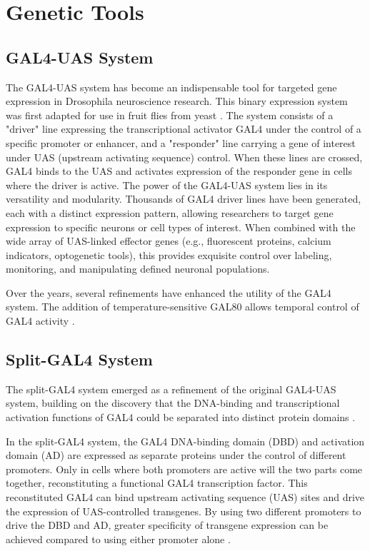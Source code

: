 \documentclass[../main/thesis_msc.tex]{subfiles}
\begin{document}
	\section{Genetic Tools}
	\subsection{GAL4-UAS System}

	The GAL4-UAS system has become an indispensable tool for targeted gene expression in Drosophila neuroscience research. This binary expression system was first adapted for use in fruit flies from yeast \autocite{brand_targeted_1993}. The system consists of a "driver" line expressing the transcriptional activator GAL4 under the control of a specific promoter or enhancer, and a "responder" line carrying a gene of interest under UAS (upstream activating sequence) control. When these lines are crossed, GAL4 binds to the UAS and activates expression of the responder gene in cells where the driver is active. The power of the GAL4-UAS system lies in its versatility and modularity. Thousands of GAL4 driver lines have been generated, each with a distinct expression pattern, allowing researchers to target gene expression to specific neurons or cell types of interest. When combined with the wide array of UAS-linked effector genes (e.g., fluorescent proteins, calcium indicators, optogenetic tools), this provides exquisite control over labeling, monitoring, and manipulating defined neuronal populations.

	Over the years, several refinements have enhanced the utility of the GAL4 system. The addition of temperature-sensitive GAL80 allows temporal control of GAL4 activity \autocite{mcguire_spatiotemporal_2004}.

	\subsection{Split-GAL4 System}

	The split-GAL4 system emerged as a refinement of the original GAL4-UAS system, building on the discovery that the DNA-binding and transcriptional activation functions of GAL4 could be separated into distinct protein domains \autocite{keegan_separation_1986,ma_deletion_1987}.

	In the split-GAL4 system, the GAL4 DNA-binding domain (DBD) and activation domain (AD) are expressed as separate proteins under the control of different promoters. Only in cells where both promoters are active will the two parts come together, reconstituting a functional GAL4 transcription factor. This reconstituted GAL4 can bind upstream activating sequence (UAS) sites and drive the expression of UAS-controlled transgenes. By using two different promoters to drive the DBD and AD, greater specificity of transgene expression can be achieved compared to using either promoter alone \autocite{luan_refined_2006,pfeiffer_refinement_2010}.
\end{document}
